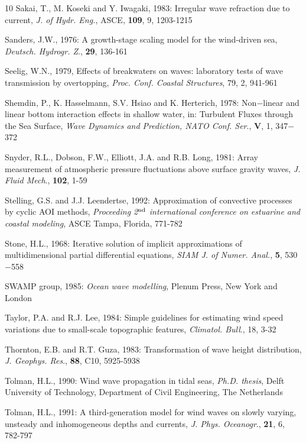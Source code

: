 \documentclass[12pt]{book}
\begin{document}
\begin{thebibliography}{10}
Sakai, T., M. Koseki and Y. Iwagaki, 1983: Irregular wave refraction due to current, {\it J. of Hydr. Eng.}, ASCE,
{\bf 109}, 9, 1203-1215

Sanders, J.W., 1976: A growth-stage scaling model for the wind-driven sea, {\it Deutsch. Hydrogr. Z}., {\bf 29}, 136-161

Seelig, W.N., 1979, Effects of breakwaters on waves: laboratory tests of wave transmission by
overtopping, {\it Proc. Conf. Coastal Structures}, 79, 2, 941-961

Shemdin, P., K. Hasselmann, S.V. Hsiao and K. Herterich, 1978: Non$-$linear and linear  bottom interaction
effects in shallow water, in: Turbulent Fluxes through the Sea Surface, {\it Wave Dynamics and
Prediction, NATO Conf. Ser}., {\bf V}, 1, 347$-$372

Snyder, R.L., Dobson, F.W., Elliott, J.A. and R.B. Long, 1981: Array measurement of atmospheric pressure
fluctuations above surface gravity waves, {\it J. Fluid Mech}., {\bf 102}, 1-59

Stelling, G.S. and J.J. Leendertse, 1992: Approximation of convective processes by cyclic AOI methods,
{\it Proceeding 2$^{{\rm nd}}$ international conference on estuarine and coastal modeling}, ASCE Tampa,
Florida, 771-782

Stone, H.L., 1968: Iterative solution of implicit approximations of multidimensional partial differential
equations, {\it SIAM J. of Numer. Anal.}, {\bf 5}, 530$-$558

SWAMP group, 1985: {\it Ocean wave modelling}, Plenum Press, New York and London

Taylor, P.A. and R.J. Lee, 1984: Simple guidelines for estimating wind speed variations due to small-scale
topographic features, {\it Climatol. Bull}., 18, 3-32

Thornton, E.B. and R.T. Guza, 1983: Transformation of wave height distribution, {\it J. Geophys. Res}., {\bf 88},
C10, 5925-5938

Tolman, H.L., 1990: Wind wave propagation in tidal seas, {\it Ph.D. thesis}, Delft University of Technology,
Department of Civil Engineering, The Netherlands

Tolman, H.L., 1991: A third-generation model for wind waves on slowly varying, unsteady and
inhomogeneous depths and currents, {\it J. Phys. Oceanogr}., {\bf 21}, 6, 782-797


\end{thebibliography}
\end{document}
